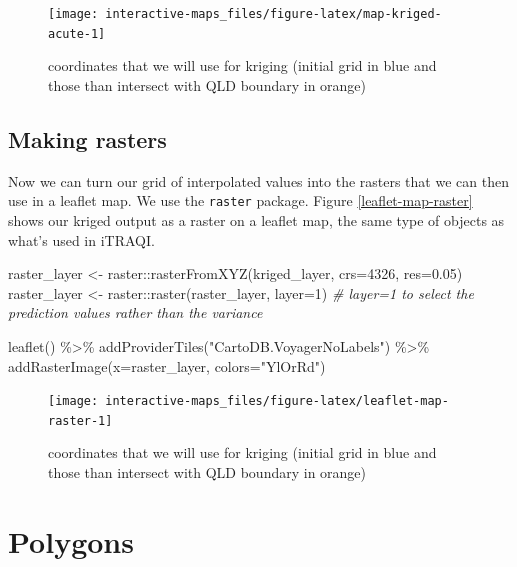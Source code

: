 \documentclass[
]{book}
\newenvironment{Shaded}{\begin{snugshade}}{\end{snugshade}}
\newcommand{\AttributeTok}[1]{\textcolor[rgb]{0.77,0.63,0.00}{#1}}
\newcommand{\CommentTok}[1]{\textcolor[rgb]{0.56,0.35,0.01}{\textit{#1}}}
\newcommand{\DecValTok}[1]{\textcolor[rgb]{0.00,0.00,0.81}{#1}}
\newcommand{\FloatTok}[1]{\textcolor[rgb]{0.00,0.00,0.81}{#1}}
\newcommand{\FunctionTok}[1]{\textcolor[rgb]{0.00,0.00,0.00}{#1}}
\newcommand{\NormalTok}[1]{#1}
\newcommand{\OtherTok}[1]{\textcolor[rgb]{0.56,0.35,0.01}{#1}}
\newcommand{\SpecialCharTok}[1]{\textcolor[rgb]{0.00,0.00,0.00}{#1}}
\newcommand{\StringTok}[1]{\textcolor[rgb]{0.31,0.60,0.02}{#1}}
\begin{document}
\begin{figure}
\texttt{[image: interactive-maps\_files/figure-latex/map-kriged-acute-1]} \caption{coordinates that we will use for kriging (initial grid in blue and those than intersect with QLD boundary in orange)}\label{fig:map-kriged-acute}
\end{figure}

\hypertarget{making-rasters}{%
\subsection{Making rasters}\label{making-rasters}}

Now we can turn our grid of interpolated values into the rasters that we can then use in a leaflet map. We use the \texttt{raster} package. Figure \ref{leaflet-map-raster} shows our kriged output as a raster on a leaflet map, the same type of objects as what's used in iTRAQI.

\begin{Shaded}
\begin{Highlighting}[]
\NormalTok{raster\_layer }\OtherTok{\textless{}{-}}\NormalTok{ raster}\SpecialCharTok{::}\FunctionTok{rasterFromXYZ}\NormalTok{(kriged\_layer, }\AttributeTok{crs=}\DecValTok{4326}\NormalTok{, }\AttributeTok{res=}\FloatTok{0.05}\NormalTok{)}
\NormalTok{raster\_layer }\OtherTok{\textless{}{-}}\NormalTok{ raster}\SpecialCharTok{::}\FunctionTok{raster}\NormalTok{(raster\_layer, }\AttributeTok{layer=}\DecValTok{1}\NormalTok{) }\CommentTok{\# layer=1 to select the prediction values rather than the variance}

\FunctionTok{leaflet}\NormalTok{() }\SpecialCharTok{\%\textgreater{}\%}
  \FunctionTok{addProviderTiles}\NormalTok{(}\StringTok{"CartoDB.VoyagerNoLabels"}\NormalTok{) }\SpecialCharTok{\%\textgreater{}\%}
  \FunctionTok{addRasterImage}\NormalTok{(}\AttributeTok{x=}\NormalTok{raster\_layer, }\AttributeTok{colors=}\StringTok{"YlOrRd"}\NormalTok{)}
\end{Highlighting}
\end{Shaded}

\begin{figure}
\texttt{[image: interactive-maps\_files/figure-latex/leaflet-map-raster-1]} \caption{coordinates that we will use for kriging (initial grid in blue and those than intersect with QLD boundary in orange)}\label{fig:leaflet-map-raster}
\end{figure}

\hypertarget{polygons}{%
\section{Polygons}\label{polygons}}
\end{document}
